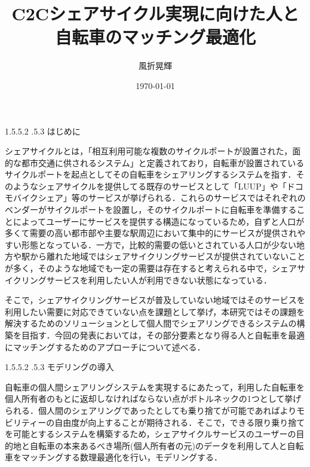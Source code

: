 \documentclass[a4paper]{jarticle}
\title{C2Cシェアサイクル実現に向けた人と自転車のマッチング最適化}
\author{風折晃輝}
\date{\today}
\makeatletter
\renewcommand{\section}{\@startsection{section}{1}{\z@}%
   {1.5\Cvs \@plus.5\Cvs \@minus.2\Cvs}%
   {.5\Cvs \@plus.3\Cvs}%
   {\reset@font\large\bfseries}}   %
\makeatother
\begin{document}




\section{はじめに}
\vspace{-3mm}
\par シェアサイクルとは，「相互利用可能な複数のサイクルポートが設置された，面的な都市交通に供されるシステム」と定義されており，自転車が設置されているサイクルポートを起点としてその自転車をシェアリングするシステムを指す．そのようなシェアサイクルを提供してる既存のサービスとして「LUUP」や「ドコモバイクシェア」等のサービスが挙げられる．これらのサービスではそれぞれのベンダーがサイクルポートを設置し，そのサイクルポートに自転車を準備することによってユーザーにサービスを提供する構造になっているため，自ずと人口が多くて需要の高い都市部や主要な駅周辺において集中的にサービスが提供されやすい形態となっている．一方で，比較的需要の低いとされている人口が少ない地方や駅から離れた地域ではシェアサイクリングサービスが提供されていないことが多く，そのような地域でも一定の需要は存在すると考えられる中で，シェアサイクリングサービスを利用したい人が利用できない状態になっている．
\par そこで，シェアサイクリングサービスが普及していない地域ではそのサービスを利用したい需要に対応できていない点を課題として挙げ，本研究ではその課題を解決するためのソリューションとして個人間でシェアリングできるシステムの構築を目指す．今回の発表においては，その部分要素となり得る人と自転車を最適にマッチングするためのアプローチについて述べる．

\vspace{-5mm}

\section{モデリングの導入}
\vspace{-3mm}
\par 自転車の個人間シェアリングシステムを実現するにあたって，利用した自転車を個人所有者のもとに返却しなければならない点がボトルネックの1つとして挙げられる．個人間のシェアリングであったとしても乗り捨てが可能であればよりモビリティーの自由度が向上することが期待される．そこで，できる限り乗り捨てを可能とするシステムを構築するため，シェアサイクルサービスのユーザーの目的地と自転車の本来あるべき場所(個人所有者の元)のデータを利用して人と自転車をマッチングする数理最適化を行い，モデリングする．
\end{document}
